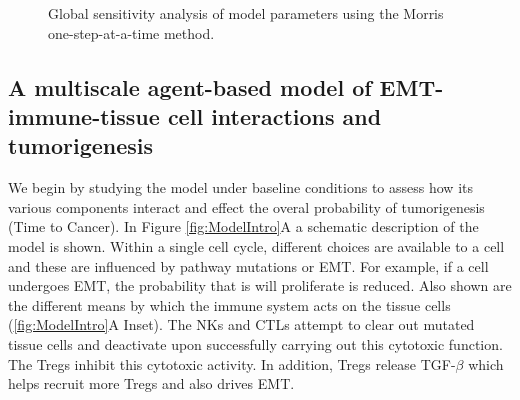 \documentclass[11pt, preprint]{article}
\newcommand{\tcr} { \textcolor{red} }
\begin{document}
\begin{figure}[H]
\center
{}
\caption{Global sensitivity analysis of model parameters using the Morris one-step-at-a-time method.}
\label{fig:MOAT}
\end{figure}

\subsection{A multiscale agent-based model of EMT-immune-tissue cell interactions and tumorigenesis}\label{ExplModel}
We begin by studying the model under baseline conditions to assess how its various components interact and effect the overal probability of tumorigenesis (Time to Cancer). In Figure \ref{fig:ModelIntro}A a schematic description of the model is shown. Within a single cell cycle, different choices are available to a cell and these are influenced by pathway mutations or EMT. For example, if a cell undergoes EMT, the probability that is will proliferate is reduced. Also shown are the different means by which the immune system acts on the tissue cells (\ref{fig:ModelIntro}A Inset). The NKs and CTLs attempt to clear out mutated tissue cells and deactivate upon successfully carrying out this cytotoxic function. The Tregs inhibit this cytotoxic activity. In addition, Tregs release TGF-$\beta$ which helps recruit more Tregs and also drives EMT.
\end{document}
